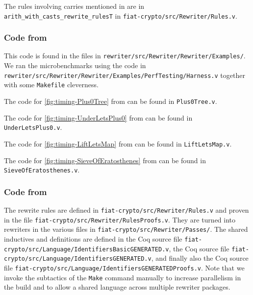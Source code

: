 \documentclass[a4paper,USenglish,cleveref,autoref,thm-restate]{lipics-v2021}
\begin{document}
The rules involving carries mentioned in
 are in \texttt{arith_with_casts_rewrite_rulesT} in \texttt{fiat-crypto/src/Rewriter/Rules.v}.

\subsubsection{Code from }

This code is found in the files in \texttt{rewriter/src/Rewriter/Rewriter/Examples/}.
We ran the microbenchmarks using the code in \texttt{rewriter/src/Rewriter/Rewriter/Examples/PerfTesting/Harness.v} together with some \texttt{Makefile} cleverness.

The code for \autoref{fig:timing-Plus0Tree} from  can be found in \texttt{Plus0Tree.v}.

The code for \autoref{fig:timing-UnderLetsPlus0} from  can be found in \texttt{UnderLetsPlus0.v}.


The code for \autoref{fig:timing-LiftLetsMap} from  can be found in \texttt{LiftLetsMap.v}.

The code for \autoref{fig:timing-SieveOfEratosthenes} from  can be found in \texttt{SieveOfEratosthenes.v}.

\subsubsection{Code from }

The rewrite rules are defined in \texttt{fiat-crypto/src/Rewriter/Rules.v} and proven in the file \texttt{fiat-crypto/src/Rewriter/RulesProofs.v}.
They are turned into rewriters in the various files in \texttt{fiat-crypto/src/Rewriter/Passes/}.
The shared inductives and definitions are defined in the Coq source file \texttt{fiat-crypto/src/Language/IdentifiersBasicGENERATED.v}, the Coq source file \texttt{fiat-crypto/src/Language/IdentifiersGENERATED.v}, and finally also the Coq source file \texttt{fiat-crypto/src/Language/IdentifiersGENERATEDProofs.v}.
Note that we invoke the subtactics of the \texttt{Make} command manually to increase parallelism in the build and to allow a shared language across multiple rewriter packages.
\end{document}
